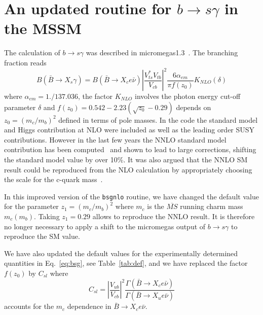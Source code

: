 \documentclass[12pt,a4paper]{article}
\begin{document}
{\appendix
\section{An updated routine for $b\rightarrow s\gamma$ in the MSSM}
The calculation of $b\rightarrow s\gamma$ was described in micromegas1.3~\cite{Belanger:2004yn}. 
The branching fraction reads
\begin{equation}
B(\bar{B}\rightarrow X_s \gamma) =B(\bar{B}\rightarrow X_c e\bar\nu) \left|\frac{V_{ts}^* V_{tb}}
{V_{cb}}\right|^2 \frac{6\alpha_{em}}{\pi f(z_0)} K_{NLO}(\delta)
\label{eq:bsg}
\end{equation}
where $\alpha_{em}=1./137.036$, the factor $K_{NLO}$ involves the photon energy cut-off parameter
$\delta$ and $f(z_0)=0.542-2.23(\sqrt{z_0} -0.29)$ depends on $z_0=(m_c/m_b)^2$ defined in terms of pole
masses.  
In the code 
the standard model and Higgs contribution at NLO were included as well as the leading order SUSY
contributions. However in the last few years
 the NNLO standard model contribution has been computed~\cite{Misiak:2006zs} and shown to lead to large corrections, shifting
 the standard model value by over 10\%. 
 It was also argued that the NNLO SM result could be reproduced from
 the NLO calculation by appropriately choosing the scale for the c-quark mass~\cite{Misiak:2006ab,Gambino:2008fj}. 



 In this improved version of the {\tt bsgnlo} routine, we 
 have changed the default value for the parameter $z_1=(m_c/m_b)^2$
 where $m_c$ is the $\overline{MS}$ running charm mass $m_c(m_b)$. Taking $z_1=0.29$ allows 
 to reproduce the NNLO result. 
 It is therefore no longer necessary to apply a shift to  the micromegas output of $b\rightarrow s\gamma$
 to reproduce the SM value. 


We have also updated the default values for the experimentally determined quantities in
Eq.~\ref{eq:bsg}, see Table~\ref{tab:def}, and we have replaced the factor $f(z_0)$ by $C_{sl}$ where
\begin{equation}
C_{sl}=\left|\frac{V_{ub}}{V_{cb}}\right|^2 \frac{\Gamma(\bar{B}\rightarrow X_c e\bar\nu)}{\Gamma(\bar{B}\rightarrow X_u e\bar\nu)}
\end{equation}
accounts for the $m_c$ dependence in $\bar{B}\rightarrow X_c e\bar\nu$.


}
\end{document}
